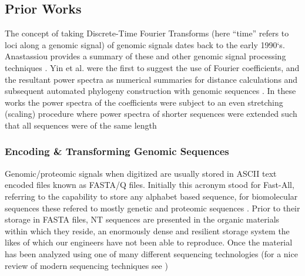 \documentclass[12pt,journal,compsoc]{IEEEtran}
\begin{document}
\subsection{Prior Works}
\label{sec:pw}
The concept of taking Discrete-Time Fourier Transforms (here ``time'' refers to loci along a genomic signal) 
of genomic signals dates back to the early 1990`s.  Anastassiou provides a summary of these and other
genomic signal processing techniques \cite{Ana01}. 
Yin et al. were the first to suggest the use of Fourier coefficients, and the resultant power spectra as 
numerical summaries for distance calculations and subsequent automated phylogeny construction with 
genomic sequences \cite{yin20, yin14, yin15}.
In these works the power spectra of the coefficients were subject to an even stretching (scaling) procedure 
where power spectra of shorter sequences were extended such that all sequences were of the same length


\subsubsection{Encoding \& Transforming Genomic Sequences}
Genomic/proteomic signals when digitized are usually stored in ASCII text encoded files known as FASTA/Q 
files.  Initially this acronym stood for Fast-All, referring to the capability to store any alphabet based 
sequence, for biomolecular sequences these refered to mostly genetic and proteomic sequences \cite{Lip85}.  
Prior to their storage in FASTA files, NT sequences are presented in the organic materials within which they reside, an enormously dense and resilient storage system the likes of which our engineers have not been able to reproduce. 
Once the material has been analyzed using one of many different sequencing technologies (for a nice review of modern sequencing techniques see \cite{Met10})
\end{document}
